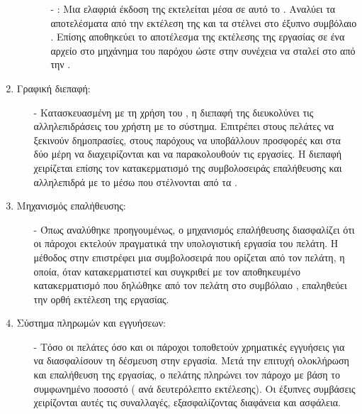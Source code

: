 \begin{enumerate}
\begin{itemize}
\begin{itemize}
            \item[-] : Μια ελαφριά έκδοση της  εκτελείται μέσα σε αυτό το . Αναλύει τα αποτελέσματα από την εκτέλεση της  και τα στέλνει στο έξυπνο συμβόλαιο . Επίσης αποθηκεύει το αποτέλεσμα της εκτέλεσης της εργασίας σε ένα αρχείο στο μηχάνημα του παρόχου ώστε στην συνέχεια να σταλεί στο  από την .
        \end{itemize}
    \end{itemize}
    \item Γραφική διεπαφή:
        \begin{itemize}
            \item[-] Κατασκευασμένη με τη χρήση του , η διεπαφή της  διευκολύνει τις αλληλεπιδράσεις του χρήστη με το σύστημα. Επιτρέπει στους πελάτες να ξεκινούν δημοπρασίες, στους παρόχους να υποβάλλουν προσφορές και στα δύο μέρη να διαχειρίζονται και να παρακολουθούν τις εργασίες. Η διεπαφή χειρίζεται επίσης τον κατακερματισμό της συμβολοσειράς επαλήθευσης και αλληλεπιδρά με το  μέσω  που στέλνονται από τα . 
        \end{itemize}
    \item Μηχανισμός επαλήθευσης:
     \begin{itemize}
        \item[-] Όπως αναλύθηκε προηγουμένως, ο μηχανισμός επαλήθευσης διασφαλίζει ότι οι πάροχοι εκτελούν πραγματικά την υπολογιστική εργασία του πελάτη. Η μέθοδος  στην  επιστρέφει μια συμβολοσειρά που ορίζεται από τον πελάτη, η οποία, όταν κατακερματιστεί και συγκριθεί με τον αποθηκευμένο κατακερματισμό που δηλώθηκε από τον πελάτη στο συμβόλαιο , επαληθεύει την ορθή εκτέλεση της εργασίας.
     \end{itemize}
    \item Σύστημα πληρωμών και εγγυήσεων: 
    \begin{itemize}
        \item[-] Τόσο οι πελάτες όσο και οι πάροχοι τοποθετούν χρηματικές εγγυήσεις για να διασφαλίσουν τη δέσμευση στην εργασία. Μετά την επιτυχή ολοκλήρωση και επαλήθευση της εργασίας, ο πελάτης πληρώνει τον πάροχο με βάση το συμφωνημένο ποσοστό ( ανά δευτερόλεπτο εκτέλεσης). Οι έξυπνες συμβάσεις χειρίζονται αυτές τις συναλλαγές, εξασφαλίζοντας διαφάνεια και ασφάλεια.
    \end{itemize}
\end{enumerate}


